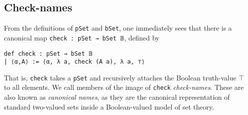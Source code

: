 \documentclass[a4paper,USenglish,cleveref, autoref]{lipics-v2019}
\newcommand{\lil}{\lstinline}
\begin{document}


\subsection{Check-names}
From the definitions of \lil{pSet} and \lil{bSet}, one immediately sees that there is a canonical map \lil{check : pSet → bSet 𝔹}, defined by
\begin{lstlisting}
def check : pSet → bSet 𝔹
| ⟨α,A⟩ := ⟨α, λ a, check (A a), λ a, ⊤⟩
\end{lstlisting}

That is, \lil{check} takes a \lil{pSet} and recursively attaches the Boolean truth-value $\top$ to all elements. We call members of the image of \lil{check} \emph{check-names}. These are also known as \emph{canonical names}, as they are the canonical representation of standard two-valued sets inside a Boolean-valued model of set theory.
\end{document}
